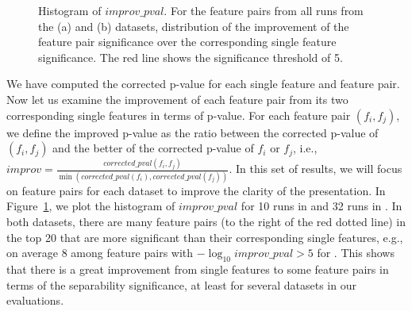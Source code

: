 \begin{figure}[h]
\centering %
\vspace{-3mm}
\vspace{-5mm}
\caption{Histogram of $improv\_pval$. For the \toptwenty feature pairs from all runs from the (a) \msig and (b) \lincs datasets, distribution of the improvement of the feature pair significance over the corresponding single feature significance. The red line shows the significance threshold of 5.}
\vspace{-5mm}
\label{fig:histogram_diff}
\end{figure}


 We have computed the corrected p-value for each single feature and feature pair. Now let us examine the improvement of each feature pair from its two corresponding single features in terms of p-value. For each feature pair $(f_i,f_j)$, we define the improved p-value  as the ratio between the corrected p-value of $(f_i,f_j)$ and the better of the corrected p-value of $f_i$ or $f_j$, i.e., $improv = \frac{corrected\_pval(f_i,f_j)}{\min(corrected\_pval(f_i),corrected\_pval(f_j))}$. In this set of results, we will focus on \toptwenty feature pairs for each dataset to improve the clarity of the presentation. In Figure~\ref{fig:histogram_diff}, we plot the histogram of $improv\_pval$ for 10 runs in \msig and 32 runs in \lincs. In both datasets, there are many feature pairs (to the right of the red dotted line) in the top 20 that are more significant than their corresponding single features, e.g., on average 8 among \toptwenty feature pairs with $-\log_{10} improv\_pval > 5$ for \lincs. This shows that there is a great improvement from single features to some feature pairs in terms of the separability significance, at least for several datasets in our evaluations. 


